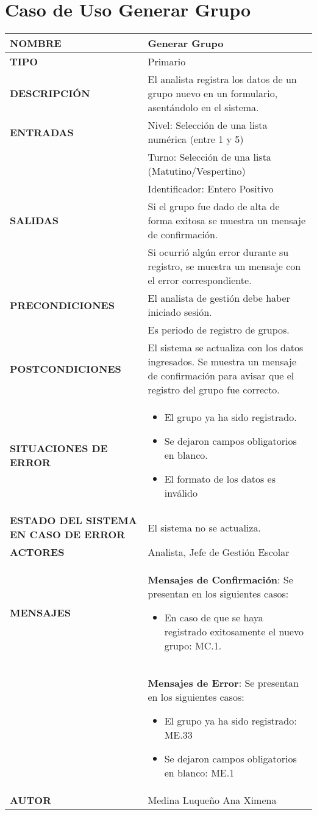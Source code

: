 \newpage
\section{Caso de Uso Generar Grupo}
\begin{longtable}{ | p{6cm} | p{10cm} |}
\hline
\textbf{NOMBRE} & Generar Grupo\\
\hline
\textbf{TIPO} & Primario\\
\hline
\textbf{DESCRIPCIÓN} & El analista registra los datos de un grupo nuevo en un formulario, asentándolo en el sistema.\\
\hline
\textbf{ENTRADAS} & Nivel: Selección de una lista numérica (entre 1 y 5)\\ & Turno: Selección de una lista (Matutino/Vespertino)\\ & Identificador: Entero Positivo\\
\hline
\textbf{SALIDAS} & Si el grupo fue dado de alta de forma exitosa se muestra un mensaje de confirmación.\\ & Si ocurrió algún error durante su registro, se muestra un mensaje con el error correspondiente.\\
\hline
\textbf{PRECONDICIONES} & El analista de gestión debe haber iniciado sesión.\\ & Es periodo de registro de grupos.\\
\hline
\textbf{POSTCONDICIONES} & El sistema se actualiza con los datos ingresados. Se muestra un mensaje de confirmación para avisar que el registro del grupo fue correcto.\\
\hline
\textbf{SITUACIONES DE ERROR} & \begin{itemize}
    \item El grupo ya ha sido registrado.
    \item Se dejaron campos obligatorios en blanco.
    \item El formato de los datos es inválido
\end{itemize}\\
\hline
\textbf{ESTADO DEL SISTEMA EN CASO DE ERROR} & El sistema no se actualiza.\\
\hline
\textbf{ACTORES} & Analista, Jefe de Gestión Escolar\\
\hline
\textbf{MENSAJES} & \textbf{Mensajes de Confirmación}: Se presentan en los siguientes casos: \begin{itemize}
    \item En caso de que se haya registrado exitosamente el nuevo grupo: MC.1.
\end{itemize}\\ & \textbf{Mensajes de Error}: Se presentan en los siguientes casos: \begin{itemize}
    \item El grupo ya ha sido registrado: ME.33
    \item Se dejaron campos obligatorios en blanco: ME.1
\end{itemize}\\
\hline
\textbf{AUTOR} & Medina Luqueño Ana Ximena\\
\hline
\end{longtable}
